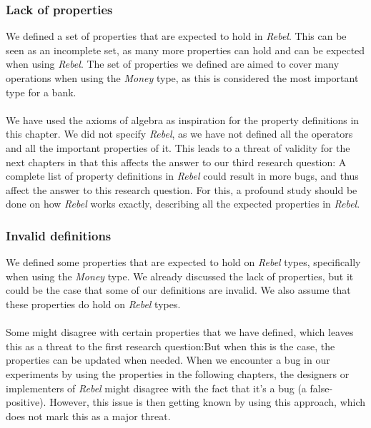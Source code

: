 \subsubsection{Lack of properties}
We defined a set of properties that are expected to hold in \textit{Rebel}.
This can be seen as an incomplete set, as many more properties can hold and can
be expected when using \textit{Rebel}. The set of properties we defined are
aimed to cover many operations when using the \textit{Money} type, as this is
considered the most important type for a bank.\\
\\
We have used the axioms of algebra as inspiration for the property definitions
in this chapter. We did not specify \textit{Rebel}, as we have not defined all
the operators and all the important properties of it. This leads to a threat of
validity for the next chapters in that this affects the answer to our third
research question:\rqThree
A complete list of property definitions in
\textit{Rebel} could result in more bugs, and thus affect the answer to this
research question. For this, a profound study should be done on how
\textit{Rebel} works exactly, describing all the expected properties in
\textit{Rebel}.

\subsubsection{Invalid definitions}
We defined some properties that are expected to hold on \textit{Rebel} types,
specifically when using the \textit{Money} type. We already discussed the lack
of properties, but it could be the case that some of our definitions are
invalid. We also assume that these properties do hold on \textit{Rebel}
types.\\
\\
Some might disagree with certain properties that we have defined, which leaves
this as a threat to the first research question:\rqOne But when this is the
case, the properties can be updated when needed. When we encounter a bug in our
experiments by using the properties in the following chapters, the designers or
implementers of \textit{Rebel} might disagree with the fact that it's a bug
(a false-positive). However, this issue is then getting known by using this
approach, which does not mark this as a major threat.


